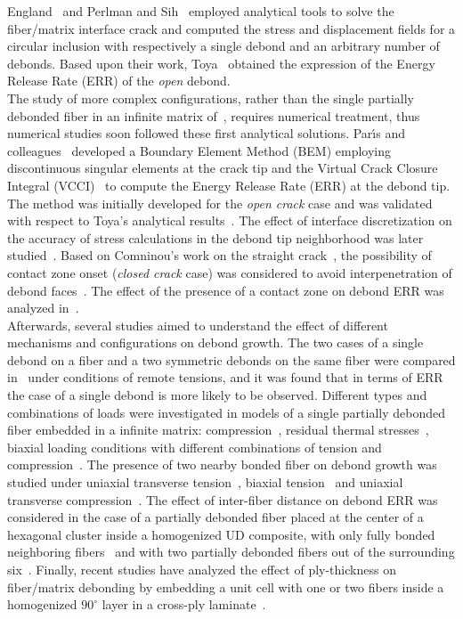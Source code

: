 England~\cite{England1966} and Perlman and Sih~\cite{Perlman1967} employed analytical tools to solve the fiber/matrix interface crack and computed the stress and displacement fields for a circular inclusion with respectively a single debond and an arbitrary number of debonds. Based upon their work, Toya~\cite{Toya1974} obtained the expression of the Energy Release Rate (ERR) of the \emph{open} debond.\\
The study of more complex configurations, rather than the single partially debonded fiber in an infinite matrix of~\cite{England1966,Perlman1967,Toya1974}, requires numerical treatment, thus numerical studies soon followed these first analytical solutions. Par{\'{\i}}s and colleagues~\cite{Paris1996} developed a Boundary Element Method (BEM) employing discontinuous singular elements at the crack tip and the Virtual Crack Closure Integral (VCCI)~\cite{Irwin1958} to compute the Energy Release Rate (ERR) at the debond tip. The method was initially developed for the \emph{open crack} case and was validated with respect to Toya's analytical results~\cite{Toya1974}. The effect of interface discretization on the accuracy of stress calculations in the debond tip neighborhood was later studied~\cite{DelCano1997}. Based on Comninou's work on the straight crack~\cite{Comninou1977}, the possibility of contact zone onset (\emph{closed crack} case) was considered to avoid interpenetration of debond faces~\cite{Paris1996}. The effect of the presence of a contact zone on debond ERR was analyzed in~\cite{Varna1997a}.\\
Afterwards, several studies aimed to understand the effect of different mechanisms and configurations on debond growth. The two cases of a single debond on a fiber and a two symmetric debonds on the same fiber were compared in~\cite{Garcia2015} under conditions of remote tensions, and it was found that in terms of ERR the case of a single debond is more likely to be observed. Different types and combinations of loads were investigated in models of a single partially debonded fiber embedded in a infinite matrix: compression~\cite{Correa2007}, residual thermal stresses~\cite{Correa2011}, biaxial loading conditions with different combinations of tension and compression~\cite{Correa2013, Correa2014}. The presence of two nearby bonded fiber on debond growth was studied under uniaxial transverse tension~\cite{Sandino2016}, biaxial tension~\cite{Sandino2016b} and uniaxial transverse compression~\cite{Sandino2018}. The effect of inter-fiber distance on debond ERR was considered in the case of a partially debonded fiber placed at the center of a hexagonal cluster inside a homogenized UD composite, with only fully bonded neighboring fibers~\cite{Zhuang2018} and with two partially debonded fibers out of the surrounding six~\cite{Varna2017}. Finally, recent studies have analyzed the effect of ply-thickness on fiber/matrix debonding by embedding a unit cell with one or two fibers inside a homogenized $90^{\circ}$ layer in a cross-ply laminate~\cite{Paris2018,Velasco2018}.

